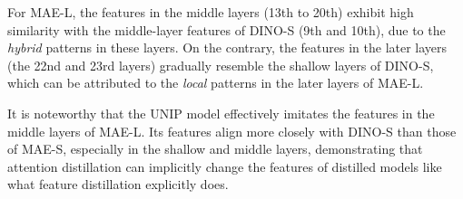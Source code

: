 For MAE-L, the features in the middle layers (13th to 20th) exhibit high similarity with the middle-layer features of DINO-S (9th and 10th), due to the \textit{hybrid} patterns in these layers. On the contrary, the features in the later layers (the 22nd and 23rd layers) gradually resemble the shallow layers of DINO-S, which can be attributed to the \textit{local} patterns in the later layers of MAE-L.

It is noteworthy that the UNIP model effectively imitates the features in the middle layers of MAE-L. Its features align more closely with DINO-S than those of MAE-S, especially in the shallow and middle layers, demonstrating that attention distillation can implicitly change the features of distilled models like what feature distillation explicitly does.
